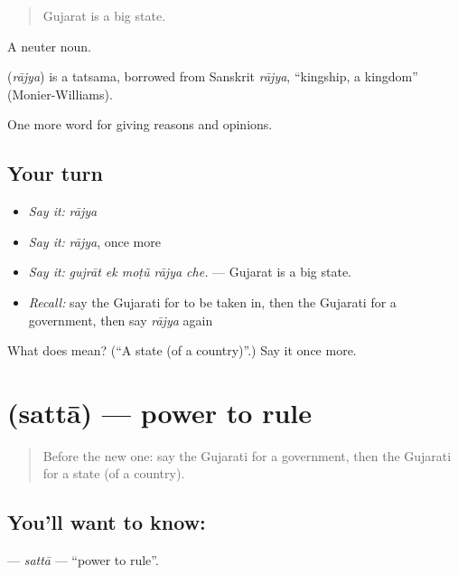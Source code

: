 \begin{quote}
Gujarat is a big state.
\end{quote}

A neuter noun.

\begin{cousinweb}
\textbf{} (\emph{rājya}) is a tatsama, borrowed from Sanskrit \emph{rājya}, \textquotedblleft{}kingship, a kingdom\textquotedblright{} (Monier-Williams).
\end{cousinweb}

\begin{grammarlens}[title={What you've built}]
One more word for giving reasons and opinions.
\end{grammarlens}

\subsection*{Your turn}
\begin{itemize}
\raggedright
  \item \emph{Say it:} \emph{rājya}
  \item \emph{Say it:} \emph{rājya}, once more
  \item \emph{Say it:} \emph{gujrāt ek moṭũ rājya che.} — Gujarat is a big state.
  \item \emph{Recall:} say the Gujarati for to be taken in, then the Gujarati for a government, then say \emph{rājya} again
\end{itemize}

\begin{tcolorbox}[breakable,colback=teal!4,colframe=teal!35!black,title={Before you move on}]
What does  mean? (\textquotedblleft{}A state (of a country)\textquotedblright{}.) Say it once more.
\end{tcolorbox}
\section[\texorpdfstring{\gu{સત્તા} (sattā)}{સત્તા (sattā)}]{ (sattā) — power to rule}

\label{lesson:GU-C352-satta}



\begin{quote}
Before the new one: say the Gujarati for a government, then the Gujarati for a state (of a country).
\end{quote}

\subsection*{You'll want to know: }
\textbf{} — \emph{sattā} — \textquotedblleft{}power to rule\textquotedblright{}.

